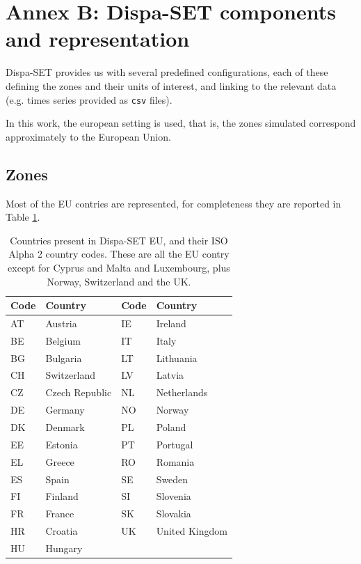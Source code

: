 \newpage
\section{Annex B: Dispa-SET components and representation}

Dispa-SET provides us with several predefined configurations, each of these defining the zones and their units of interest, and linking to the relevant data (e.g. times series provided as \texttt{csv} files).

In this work, the european setting is used, that is, the zones simulated correspond approximately to the European Union.

\subsection{Zones}

Most of the EU contries are represented, for completeness they are reported in Table \ref{table:countries-eu}.

\begin{table}[h]
    \centering
	\begin{tabular}{|l l|l l|}
		\hline
		Code & Country & Code & Country \\
		\hline
		AT & Austria        & IE & Ireland \\
		BE & Belgium        & IT & Italy \\
		BG & Bulgaria       & LT & Lithuania \\
		CH & Switzerland    & LV & Latvia \\
		CZ & Czech Republic & NL & Netherlands \\
		DE & Germany        & NO & Norway \\
		DK & Denmark        & PL & Poland \\
		EE & Estonia        & PT & Portugal \\
		EL & Greece         & RO & Romania \\
		ES & Spain          & SE & Sweden \\
		FI & Finland        & SI & Slovenia \\
		FR & France         & SK & Slovakia \\
		HR & Croatia        & UK & United Kingdom \\
		HU & Hungary        & & \\
		\hline
	\end{tabular}
	\caption{Countries present in Dispa-SET EU, and their ISO Alpha 2 country codes. These are all the EU contry except for Cyprus and Malta and Luxembourg, plus Norway, Switzerland and the UK.}
	\label{table:countries-eu}
\end{table}

